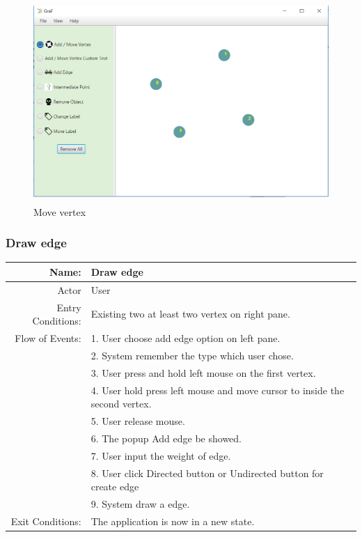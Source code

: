 \documentclass[a4paper,10pt]{article}
\begin{document}
\begin{figure}[H]
		\centering
		\includegraphics[height = 3in]{drawVertex.png}
		\caption[Optional caption]{Move vertex}
		\label{fig:Repository}
	\end{figure}
\paragraph{}

\subsubsection{Draw edge}
	\begin{tabular}{|r|l|}
\hline
Name: & Draw edge \\
\hline
Actor & User \\
\hline
Entry Conditions: & Existing two at least two vertex on right pane. \\
\hline
Flow of Events: & 1. User choose add edge option on left pane. \\
& 2. System remember the type which user chose.  \\
& 3. User press and hold left mouse on the first vertex.  \\
& 4. User hold press left mouse and move cursor to inside the second vertex.  \\
& 5. User release mouse.  \\
& 6. The popup Add edge be showed.  \\
& 7. User input the weight of edge.  \\
& 8. User click Directed button or Undirected button for create edge   \\
& 9. System draw a edge.   \\
\hline
Exit Conditions: & The application is now in a new state. \\
\hline

\end{tabular}
\end{document}
